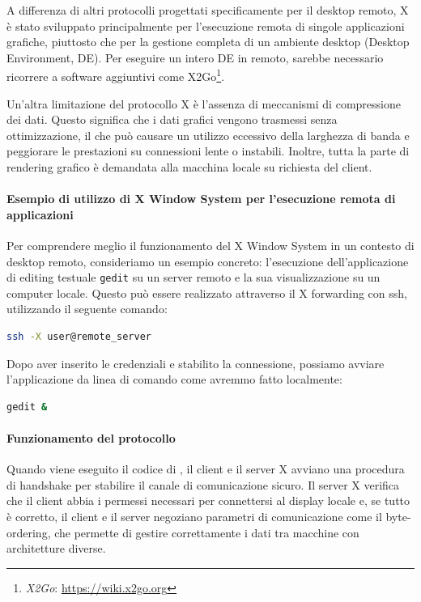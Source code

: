 \documentclass[12pt,a4paper,openright,twoside]{book}
\begin{document}
A differenza di altri protocolli progettati specificamente per il desktop remoto,
X è stato sviluppato principalmente per l'esecuzione remota di singole applicazioni grafiche,
piuttosto che per la gestione completa di un ambiente desktop (Desktop Environment, DE).
%
Per eseguire un intero DE in remoto, sarebbe necessario ricorrere a software aggiuntivi come X2Go\footnote{\emph{X2Go}: \url{https://wiki.x2go.org}}.

Un'altra limitazione del protocollo X è l'assenza di meccanismi di compressione dei dati.
Questo significa che i dati grafici vengono trasmessi senza ottimizzazione,
il che può causare un utilizzo eccessivo della larghezza di banda e peggiorare le prestazioni su connessioni lente o instabili.
%
Inoltre, tutta la parte di rendering grafico è demandata alla macchina locale su richiesta del client.

\paragraph{Esempio di utilizzo di X Window System per l'esecuzione remota di applicazioni}
Per comprendere meglio il funzionamento del X Window System in un contesto di desktop remoto, consideriamo un esempio concreto:
l'esecuzione dell'applicazione di editing testuale \texttt{gedit} su un server remoto e la sua visualizzazione su un computer locale.
Questo può essere realizzato attraverso il X forwarding con ssh, utilizzando il seguente comando:

\begin{lstlisting}[caption={Connessione remota con X forwarding}, label={lst:ssh-x}, language=bash]
ssh -X user@remote_server
\end{lstlisting}

Dopo aver inserito le credenziali e stabilito la connessione, possiamo avviare l'applicazione da linea di comando come avremmo fatto localmente:

\begin{lstlisting}[caption={Esecuzione di gedit su server remoto}, label={lst:gedit}, language=bash]
gedit &
\end{lstlisting}

\paragraph{Funzionamento del protocollo}
Quando viene eseguito il codice di ,
il client e il server X avviano una procedura di handshake per stabilire il canale di comunicazione sicuro.
%
Il server X verifica che il client abbia i permessi necessari per connettersi al display locale e,
se tutto è corretto,
il client e il server negoziano parametri di comunicazione come il byte-ordering,
che permette di gestire correttamente i dati tra macchine con architetture diverse.
\end{document}
